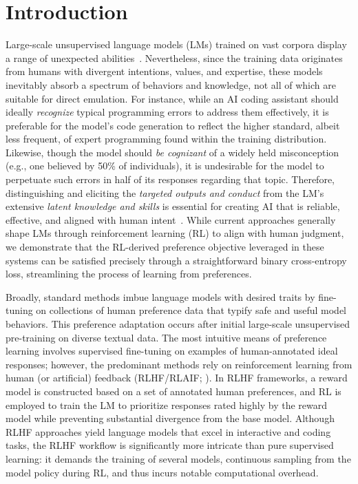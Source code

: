 \section{Introduction}
Large-scale unsupervised language models (LMs) trained on vast corpora display a range of unexpected abilities~\citep{chowdhery2022palm, brown2020language, touvron2023llama,bubeck2023sparks}. Nevertheless, since the training data originates from humans with divergent intentions, values, and expertise, these models inevitably absorb a spectrum of behaviors and knowledge, not all of which are suitable for direct emulation. For instance, while an AI coding assistant should ideally \textit{recognize} typical programming errors to address them effectively, it is preferable for the model’s code generation to reflect the higher standard, albeit less frequent, of expert programming found within the training distribution. Likewise, though the model should \textit{be cognizant} of a widely held misconception (e.g., one believed by 50\% of individuals), it is undesirable for the model to perpetuate such errors in half of its responses regarding that topic. Therefore, distinguishing and eliciting the \emph{targeted outputs and conduct} from the LM’s extensive \textit{latent knowledge and skills} is essential for creating AI that is reliable, effective, and aligned with human intent~\citep{ouyang2022training}. While current approaches generally shape LMs through reinforcement learning (RL) to align with human judgment, we demonstrate that the RL-derived preference objective leveraged in these systems can be satisfied precisely through a straightforward binary cross-entropy loss, streamlining the process of learning from preferences.

Broadly, standard methods imbue language models with desired traits by fine-tuning on collections of human preference data that typify safe and useful model behaviors. This preference adaptation occurs after initial large-scale unsupervised pre-training on diverse textual data. The most intuitive means of preference learning involves supervised fine-tuning on examples of human-annotated ideal responses; however, the predominant methods rely on reinforcement learning from human (or artificial) feedback (RLHF/RLAIF; \citep{christiano2017deep,bai2022constitutional}). In RLHF frameworks, a reward model is constructed based on a set of annotated human preferences, and RL is employed to train the LM to prioritize responses rated highly by the reward model while preventing substantial divergence from the base model. Although RLHF approaches yield language models that excel in interactive and coding tasks, the RLHF workflow is significantly more intricate than pure supervised learning: it demands the training of several models, continuous sampling from the model policy during RL, and thus incurs notable computational overhead.

